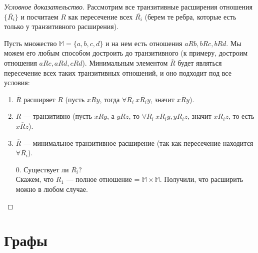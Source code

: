 \documentclass[russian]{lecture-notes}
\begin{document}
	\begin{proof}[Условное доказательство]
		Рассмотрим все транзитивные расширения отношения $\{\overline{R_i}\}$ и посчитаем $R$ как пересечение всех $\overline{R_i}$ (берем те ребра, которые есть только у транзитивного расширения).
		
		\begin{example}
			Пусть множество $\mathbb{M} = \{a,b,c,d\}$ и на нем есть отношения $aRb, bRc, bRd$. Мы можем его любым способом достроить до транзитивного (к примеру, достроим отношения $aRc,aRd,cRd$). Минимальным элементом $\overline R$ будет являться пересечение всех таких транзитивных отношений, и оно подходит под все условия:
			\begin{enumerate}
				\item $\overline R$ расширяет $R$ (пусть $xRy$, тогда $\forall \overline{R_i}~x \overline{R_i} y$, значит $x \overline R y$).
				\item $\overline R$ --- транзитивно (пусть $x \overline R y$, а $y \overline R z$, то $\forall \overline{R_i}~x \overline{R_i} y, y \overline{R_i} z$, значит $x \overline{R_i} z$, то есть $x \overline R z$).
				\item $\overline R$ --- минимальное транзитивное расширение (так как пересечение находится $\forall \overline{R_i}$).
				\item[0.] Существует ли $\overline{R_i}$?\\
				Скажем, что $R_1$ --- полное отношение = $\mathbb{M} \times \mathbb{M}$. Получили, что расширить можно в любом случае.
			\end{enumerate}
		\end{example}
	\end{proof}
	
	\section{Графы}
\end{document}
